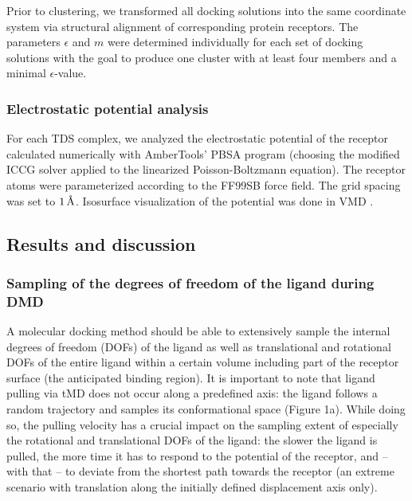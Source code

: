 Prior to clustering, we transformed all docking solutions into the same
coordinate system via structural alignment of corresponding protein receptors.
The parameters $\epsilon$ and $m$ were determined individually for each set of
docking solutions with the goal to produce one cluster with at least four
members and a minimal $\epsilon$-value.

\subsubsection{Electrostatic potential analysis}
For each TDS complex, we analyzed the electrostatic potential of the receptor
calculated numerically with AmberTools' PBSA program (choosing the modified ICCG
solver applied to the linearized Poisson-Boltzmann equation). The receptor atoms
were parameterized according to the FF99SB force field. The grid spacing was set
to  $1\,\textup{\AA}$. Isosurface visualization of the potential was done in VMD
\cite{vmd1996}.


\subsection{Results and discussion}

\subsubsection{Sampling of the degrees of freedom of the ligand during DMD}

A molecular docking method should be able to extensively sample the internal
degrees of freedom (DOFs) of the ligand as well as translational and rotational
DOFs of the entire ligand within a certain volume including part of the receptor
surface (the anticipated binding region). It is important to note that ligand
pulling via tMD does not occur along a predefined axis: the ligand follows a
random trajectory and samples its conformational space (Figure 1a). While doing
so, the pulling velocity has a crucial impact on the sampling extent of
especially the rotational and translational DOFs of the ligand: the slower the
ligand is pulled, the more time it has to respond to the potential of the
receptor, and -- with that -- to deviate from the shortest path towards the
receptor (an extreme scenario with translation along the initially defined
displacement axis only).

